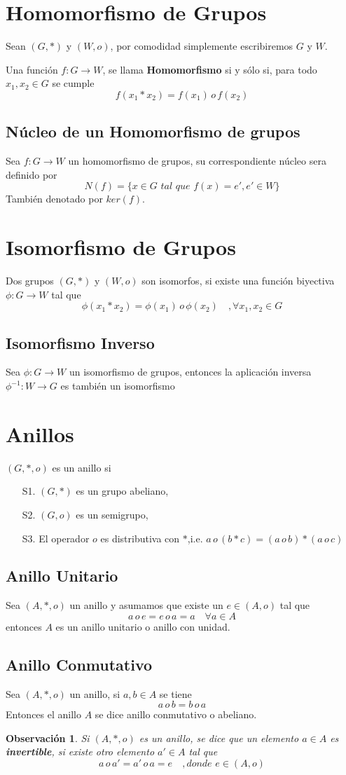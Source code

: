 \documentclass{article}
\newtheorem*{remark}{Observación}
\begin{document}
\section{Homomorfismo de Grupos}
Sean $(G,*)$ y $(W,o)$, por comodidad simplemente escribiremos $G$ y $W$.

Una función $f:G\longrightarrow W$, se llama \textbf{Homomorfismo} si y sólo si, para todo $x_1,x_2\in G$ se cumple
\[f(x_1*x_2)=f(x_1)\,o\,f(x_2)\]
\subsection{Núcleo de un Homomorfismo de grupos}
Sea $f:G\longrightarrow W$ un homomorfismo de grupos, su correspondiente núcleo sera definido por
\[N(f)=\{x\in G\textit{ tal que }f(x)=e',e'\in W\}\]
También denotado por $ker(f)$.
\section{Isomorfismo de Grupos}
Dos grupos $(G,*)$ y $(W,o)$ son isomorfos, si existe una función biyectiva $\phi:G\longrightarrow W$ tal que
\[\phi(x_1*x_2)=\phi(x_1)\,o\,\phi(x_2)\quad,\forall x_1,x_2\in G\]
\subsection{Isomorfismo Inverso}
Sea $\phi:G\longrightarrow W$ un isomorfismo de grupos, entonces la aplicación inversa $\phi^{-1}:W\longrightarrow G$ es también un isomorfismo
\section{Anillos}
$(G,*,o)$ es un anillo si 
\begin{itemize}
    \item[S1.] $(G,*)$ es un grupo abeliano,
    \item[S2.] $(G,o)$ es un semigrupo,
    \item[S3.] El operador $o$ es distributiva con $*$,i.e. $a\,o\,(b*c)=(a\,o\,b)*(a\,o\,c)$
\end{itemize}
\subsection{Anillo Unitario}
Sea $(A,*,o)$ un anillo y asumamos que existe un $e\in (A,o)$ tal que
\[a\,o\,e=e\,o\,a=a\quad \forall a\in A\]
entonces $A$ es un anillo unitario o anillo con unidad.
\subsection{Anillo Conmutativo}
Sea $(A,*,o)$ un anillo, si $a,b\in A$ se tiene
\[a\,o\,b=b\,o\,a\]
Entonces el anillo $A$ se dice anillo conmutativo o abeliano.
\begin{remark}
    Si $(A,*,o)$ es un anillo, se dice que un elemento $a\in A$ es \textbf{invertible}, si existe otro elemento $a'\in A$ tal que 
    \[a\,o\,a'=a'\,o\,a=e\quad,\textit{donde } e\in(A,o)\]
\end{remark}
\end{document}
